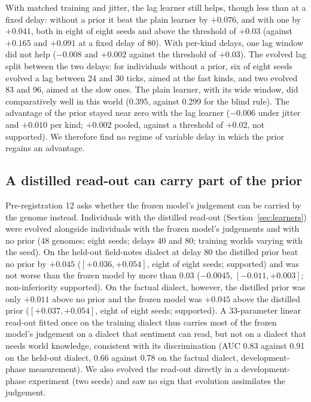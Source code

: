With matched training and jitter, the lag learner still helps, though less than at a fixed delay: without a prior it beat the plain learner by $+0.076$, and with one by $+0.041$, both in eight of eight seeds and above the threshold of $+0.03$ (against $+0.165$ and $+0.091$ at a fixed delay of 80). With per-kind delays, one lag window did not help ($-0.008$ and $+0.002$ against the threshold of $+0.03$). The evolved lag split between the two delays: for individuals without a prior, six of eight seeds evolved a lag between 24 and 30 ticks, aimed at the fast kinds, and two evolved 83 and 96, aimed at the slow ones. The plain learner, with its wide window, did comparatively well in this world (0.395, against 0.299 for the blind rule). The advantage of the prior stayed near zero with the lag learner ($-0.006$ under jitter and $+0.010$ per kind; $+0.002$ pooled, against a threshold of $+0.02$, not supported). We therefore find no regime of variable delay in which the prior regains an advantage.

\subsection{A distilled read-out can carry part of the prior}
\label{sec:res-distilled}
Pre-registration 12 asks whether the frozen model's judgement can be carried by the genome instead. Individuals with the distilled read-out (Section~\ref{sec:learners}) were evolved alongside individuals with the frozen model's judgements and with no prior (48 genomes; eight seeds; delays 40 and 80; training worlds varying with the seed). On the held-out field-notes dialect at delay 80 the distilled prior beat no prior by $+0.045$ ($[+0.036,+0.054]$, eight of eight seeds; supported) and was not worse than the frozen model by more than $0.03$ ($-0.0045$, $[-0.011,+0.003]$; non-inferiority supported). On the factual dialect, however, the distilled prior was only $+0.011$ above no prior and the frozen model was $+0.045$ above the distilled prior ($[+0.037,+0.054]$, eight of eight seeds; supported). A 33-parameter linear read-out fitted once on the training dialect thus carries most of the frozen model's judgement on a dialect that sentiment can read, but not on a dialect that needs world knowledge, consistent with its discrimination (AUC 0.83 against 0.91 on the held-out dialect, 0.66 against 0.78 on the factual dialect, development-phase measurement). We also evolved the read-out directly in a development-phase experiment (two seeds) and saw no sign that evolution assimilates the judgement.

